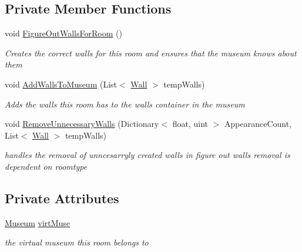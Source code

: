 \subsection*{Private Member Functions}
\begin{DoxyCompactItemize}
\item 
void \mbox{\hyperlink{class_room_aade4dd11dfe01508688d382a49d7c606}{Figure\+Out\+Walls\+For\+Room}} ()
\begin{DoxyCompactList}\small\item\em Creates the correct walls for this room and ensures that the museum knows about them \end{DoxyCompactList}\item 
void \mbox{\hyperlink{class_room_a710be7ee50b4dd0abb526e344543a513}{Add\+Walls\+To\+Museum}} (List$<$ \mbox{\hyperlink{class_wall}{Wall}} $>$ temp\+Walls)
\begin{DoxyCompactList}\small\item\em Adds the walls this room has to the walls container in the museum \end{DoxyCompactList}\item 
void \mbox{\hyperlink{class_room_ae3ade89041403549ba23b6d373e62391}{Remove\+Unnecessary\+Walls}} (Dictionary$<$ float, uint $>$ Appearance\+Count, List$<$ \mbox{\hyperlink{class_wall}{Wall}} $>$ temp\+Walls)
\begin{DoxyCompactList}\small\item\em handles the removal of unncesarryly created walls in figure out walls removal is dependent on roomtype \end{DoxyCompactList}\end{DoxyCompactItemize}
\subsection*{Private Attributes}
\begin{DoxyCompactItemize}
\item 
\mbox{\hyperlink{class_museum}{Museum}} \mbox{\hyperlink{class_room_a7b3cf4bdc95a8c1bf69ae4ff71b4f02a}{virt\+Muse}}
\begin{DoxyCompactList}\small\item\em the virtual museum this room belongs to \end{DoxyCompactList}\end{DoxyCompactItemize}
